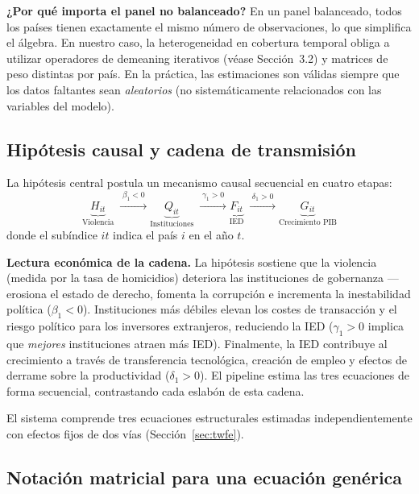 \documentclass[12pt, a4paper]{article}
\theoremstyle{definition}
\begin{document}
\begin{intuitionbox}
\textbf{¿Por qué importa el panel no balanceado?} En un panel balanceado, todos los países tienen exactamente el mismo número de observaciones, lo que simplifica el álgebra. En nuestro caso, la heterogeneidad en cobertura temporal obliga a utilizar operadores de demeaning iterativos (véase Sección~3.2) y matrices de peso distintas por país. En la práctica, las estimaciones son válidas siempre que los datos faltantes sean \emph{aleatorios} (no sistemáticamente relacionados con las variables del modelo).
\end{intuitionbox}

\subsection{Hipótesis causal y cadena de transmisión}

La hipótesis central postula un mecanismo causal secuencial en cuatro etapas:
\[
\underbrace{H_{it}}_{\text{Violencia}}
\;\xrightarrow{\;\beta_1 < 0\;}
\underbrace{Q_{it}}_{\text{Instituciones}}
\;\xrightarrow{\;\gamma_1 > 0\;}
\underbrace{F_{it}}_{\text{IED}}
\;\xrightarrow{\;\delta_1 > 0\;}
\underbrace{G_{it}}_{\text{Crecimiento PIB}}
\]
donde el subíndice $it$ indica el país $i$ en el año $t$.

\begin{intuitionbox}
\textbf{Lectura económica de la cadena.} La hipótesis sostiene que la violencia (medida por la tasa de homicidios) deteriora las instituciones de gobernanza --- erosiona el estado de derecho, fomenta la corrupción e incrementa la inestabilidad política ($\beta_1 < 0$). Instituciones más débiles elevan los costes de transacción y el riesgo político para los inversores extranjeros, reduciendo la IED ($\gamma_1 > 0$ implica que \emph{mejores} instituciones atraen más IED). Finalmente, la IED contribuye al crecimiento a través de transferencia tecnológica, creación de empleo y efectos de derrame sobre la productividad ($\delta_1 > 0$). El pipeline estima las tres ecuaciones de forma secuencial, contrastando cada eslabón de esta cadena.
\end{intuitionbox}

El sistema comprende tres ecuaciones estructurales estimadas independientemente con efectos fijos de dos vías (Sección~\ref{sec:twfe}).

\subsection{Notación matricial para una ecuación genérica}
\end{document}

